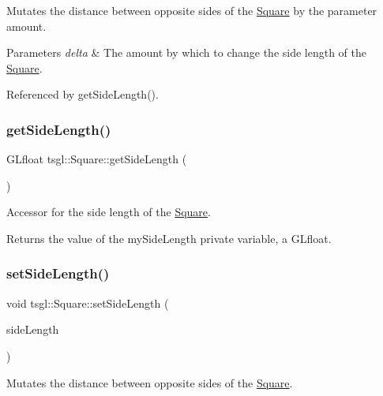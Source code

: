 Mutates the distance between opposite sides of the \hyperlink{classtsgl_1_1_square}{Square} by the parameter amount. 


\begin{DoxyParams}{Parameters}
{\em delta} & The amount by which to change the side length of the \hyperlink{classtsgl_1_1_square}{Square}. \\
\hline
\end{DoxyParams}


Referenced by get\+Side\+Length().

\mbox{\label{classtsgl_1_1_square_adf0871e17342a6a44361463015c5bc46}} 
\subsubsection{\texorpdfstring{get\+Side\+Length()}{getSideLength()}}
{\footnotesize\ttfamily G\+Lfloat tsgl\+::\+Square\+::get\+Side\+Length (\begin{DoxyParamCaption}{ }\end{DoxyParamCaption})\hspace{0.3cm}{\ttfamily [inline]}}



Accessor for the side length of the \hyperlink{classtsgl_1_1_square}{Square}. 

Returns the value of the my\+Side\+Length private variable, a G\+Lfloat. \mbox{\label{classtsgl_1_1_square_a0517236849893cdf0ab097df69e3416d}} 
\subsubsection{\texorpdfstring{set\+Side\+Length()}{setSideLength()}}
{\footnotesize\ttfamily void tsgl\+::\+Square\+::set\+Side\+Length (\begin{DoxyParamCaption}\item[{G\+Lfloat}]{side\+Length }\end{DoxyParamCaption})}



Mutates the distance between opposite sides of the \hyperlink{classtsgl_1_1_square}{Square}. 


